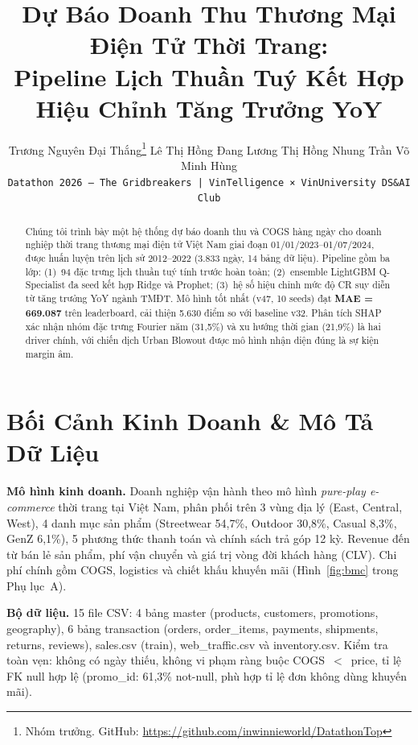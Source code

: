 \documentclass{article}
\title{Dự Báo Doanh Thu Thương Mại Điện Tử Thời Trang:\\
       Pipeline Lịch Thuần Tuý Kết Hợp Hiệu Chỉnh Tăng Trưởng YoY}
\author{%
  Trương Nguyên Đại Thắng\thanks{Nhóm trưởng. GitHub: \url{https://github.com/inwinnieworld/DatathonTop}} \And
  Lê Thị Hồng Đang \And
  Lương Thị Hồng Nhung \And
  Trần Võ Minh Hùng \\[2pt]
  \texttt{Datathon 2026 — The Gridbreakers | VinTelligence × VinUniversity DS\&AI Club}
}
\begin{document}
\maketitle

\begin{abstract}
Chúng tôi trình bày một hệ thống dự báo doanh thu và COGS hàng ngày cho doanh nghiệp thời trang thương mại điện tử Việt Nam giai đoạn 01/01/2023–01/07/2024, được huấn luyện trên lịch sử 2012–2022 (3.833 ngày, 14 bảng dữ liệu). Pipeline gồm ba lớp: (1)~94 đặc trưng lịch thuần tuý tính trước hoàn toàn; (2)~ensemble LightGBM Q-Specialist đa seed kết hợp Ridge và Prophet; (3)~hệ số hiệu chỉnh mức độ CR suy diễn từ tăng trưởng YoY ngành TMĐT. Mô hình tốt nhất (v47, 10 seeds) đạt \textbf{MAE = 669.087} trên leaderboard, cải thiện 5.630 điểm so với baseline v32. Phân tích SHAP xác nhận nhóm đặc trưng Fourier năm (31,5\%) và xu hướng thời gian (21,9\%) là hai driver chính, với chiến dịch Urban Blowout được mô hình nhận diện đúng là sự kiện margin âm.
\end{abstract}

\section{Bối Cảnh Kinh Doanh \& Mô Tả Dữ Liệu}

\textbf{Mô hình kinh doanh.}
Doanh nghiệp vận hành theo mô hình \textit{pure-play e-commerce} thời trang tại Việt Nam, phân phối trên 3 vùng địa lý (East, Central, West), 4 danh mục sản phẩm (Streetwear 54,7\%, Outdoor 30,8\%, Casual 8,3\%, GenZ 6,1\%), 5 phương thức thanh toán và chính sách trả góp 12 kỳ. Revenue đến từ bán lẻ sản phẩm, phí vận chuyển và giá trị vòng đời khách hàng (CLV). Chi phí chính gồm COGS, logistics và chiết khấu khuyến mãi (Hình~\ref{fig:bmc} trong Phụ lục~A).

\textbf{Bộ dữ liệu.} 15 file CSV: 4 bảng master (products, customers, promotions, geography), 6 bảng transaction (orders, order\_items, payments, shipments, returns, reviews), sales.csv (train), web\_traffic.csv và inventory.csv. Kiểm tra toàn vẹn: không có ngày thiếu, không vi phạm ràng buộc COGS~$<$~price, tỉ lệ FK null hợp lệ (promo\_id: 61,3\% not-null, phù hợp tỉ lệ đơn không dùng khuyến mãi).

\end{document}
